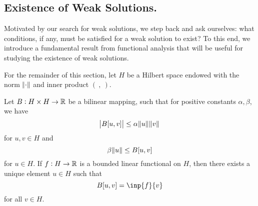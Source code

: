 \documentclass[10pt]{article}
\begin{document}
\subsection{Existence of Weak Solutions.}
Motivated by our search for weak solutions, we step back and ask ourselves: what conditions, if any, must be satisfied for a weak solution to exist? To this end, we introduce a fundamental result from functional analysis that will be useful for studying the existence of weak solutions. 
\begin{remark}
	For the remainder of this section, let $H$ be a Hilbert space endowed with the norm $\norm{\cdot}$ and inner product $(\:,\:)$. 
\end{remark}
\begin{theorem}
	\label{existence of weak solutions, lax-milgram theorem}
	Let $B: H \times H \to \mathbb{R}$ be a bilinear mapping, such that for positive constants $\alpha, \beta$, we have 
	\begin{equation*}
		\displaystyle \abs{B[u,v]} \leq \alpha \norm{u} \norm{v}
	\end{equation*}
	for $u, v \in H$ and 
	\begin{equation*}
		\displaystyle \beta \norm{u} \leq B[u,v] 
	\end{equation*}
	for $u \in H$. If $f: H \to \mathbb{R}$ is a bounded linear functional on $H$, then there exists a unique element $u \in H$ such that 
	\begin{equation*}
		\displaystyle B[u,v] = \inp{f}{v} 
	\end{equation*}
	for all $v \in H$. 
\end{theorem}
\end{document}
